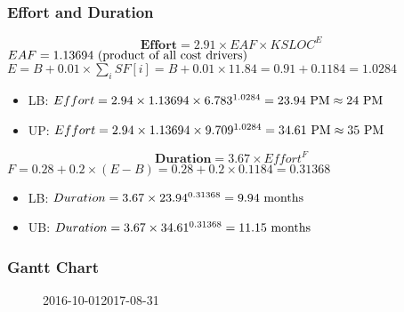 \begin{frame}
	\frametitle{Effort and Duration}
	\[ \textbf{Effort} = 2.91 \times EAF \times KSLOC^E \]
	\( EAF = 1.13694 \textnormal{ (product of all cost drivers)} \)
	\( E = B + 0.01 \times \sum_{i} SF[i] = B + 0.01 \times 11.84 = 0.91 + 0.1184 = 1.0284 \)
	\begin{itemize}
		\item LB: \( Effort = 2.94 \times 1.13694 \times 6.783^{1.0284} = 23.94\textnormal{ PM} \approx 24\textnormal{ PM} \)
		\item UP: \( Effort = 2.94 \times 1.13694 \times 9.709^{1.0284} = 34.61\textnormal{ PM} \approx 35\textnormal{ PM} \)
	\end{itemize}

	\[ \textbf{Duration} = 3.67 \times Effort^F \]
	\( F = 0.28 + 0.2 \times (E - B) = 0.28 + 0.2 \times 0.1184 = 0.31368 \)
	\begin{itemize}
		\item LB: \( Duration = 3.67 \times 23.94^{0.31368} = 9.94\textnormal{ months} \)
		\item UB: \( Duration = 3.67 \times 34.61^{0.31368} = 11.15\textnormal{ months} \)
	\end{itemize}
\end{frame}

\begin{frame}
	\frametitle{Gantt Chart}
	\begin{figure}[H]
	\centering
		\begin{ganttchart}[
			vgrid={*{6}{draw=none},dotted},
			time slot format=isodate,
			x unit=0.35mm,
			y unit chart=7.3mm,
			today=2017-02-14,
			today rule/.style= {ultra thick},
			today label=Today,
			link bulge=6, link tolerance=5,
			bar inline label node/.style={font=\scriptsize},
			inline
			]{2016-10-01}{2017-08-31}
			 \\
			 \\
			 \\
			 \\
			 \\
			 \\
			 \\
		\end{ganttchart}
	
		\label{fig:gantt}
	\end{figure}
\end{frame}
